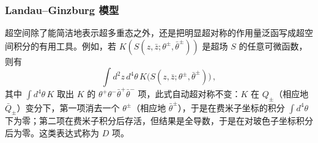 
\subsubsection{Landau--Ginzburg 模型}

超空间除了能简洁地表示超多重态之外，还是把明显超对称的作用量泛函写成超空间积分的有用工具。例如，若 $K(S(z,\bar z;\theta^\pm,\bar\theta^\pm))$ 是超场 $S$ 的任意可微函数，则有
\begin{equation}
\int d^2z\,d^4\theta\,K\big(S(z,\bar z;\theta^\pm,\bar\theta^\pm)\big)\,,
\tag{2.21}
\end{equation}
其中 $\int d^4\theta\,K$ 取出 $K$ 的 $\theta^+\theta^-\bar\theta^+\bar\theta^-$ 项，此式自动超对称不变：$K$ 在 $Q_\pm$（相应地 $\bar Q_\pm$）变分下，第一项消去一个 $\theta^\pm$（相应地 $\bar\theta^\pm$），于是在费米子坐标的积分 $\int d^4\theta$ 下为零；第二项在费米子积分后存活，但结果是全导数，于是在对玻色子坐标积分后为零。这类表达式称为 $D$ 项。



